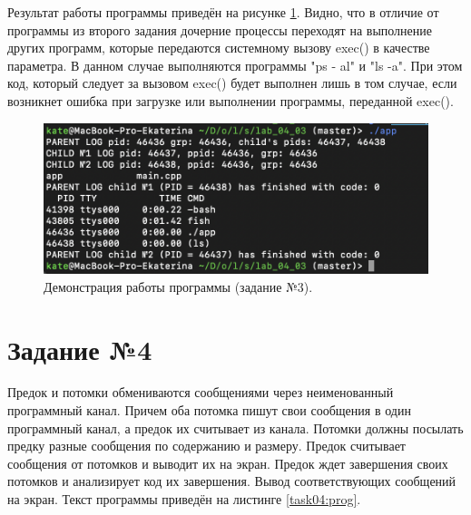 \documentclass[12pt]{report}
\begin{document}
Результат работы программы приведён на рисунке \ref{task03:demo}. Видно, что в отличие от программы из второго задания дочерние процессы переходят на выполнение других программ, которые передаются системному вызову exec() в качестве параметра. В данном случае выполняются программы "ps - al" и "ls -a". При этом код, который следует за вызовом exec() будет выполнен лишь в том случае, если возникнет ошибка при загрузке или выполнении программы, переданной exec().
\begin{figure}[H]
	\centering
	\includegraphics[width=\linewidth]{task03.png}
	\caption{Демонстрация работы программы (задание №3).}
	\label{task03:demo}

\end{figure}
\newpage
\section*{Задание №4}

Предок и потомки обмениваются сообщениями через неименованный программный канал. Причем оба потомка пишут свои сообщения в один программный канал, а предок их считывает из канала. Потомки должны посылать предку разные сообщения по содержанию и размеру. Предок считывает сообщения от потомков и выводит их на экран. Предок ждет завершения своих потомков и анализирует код их завершения. Вывод соответствующих сообщений на экран. Текст программы приведён на листинге \ref{task04:prog}.
\end{document}
